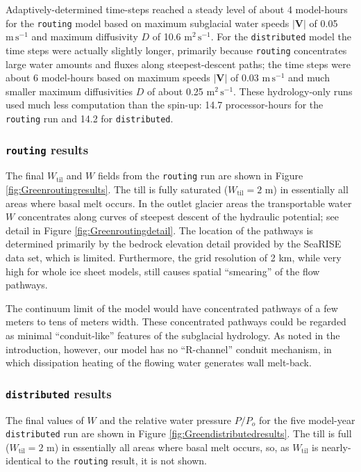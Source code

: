 \documentclass[gmd]{copernicus}   %
\newcommand{\text}{\textrm}
\newcommand\bV{\mathbf{V}}
\newcommand{\Wtil}{W_{\text{til}}}
\begin{document}
Adaptively-determined time-steps reached a steady level of about 4 model-hours for the \texttt{routing} model based on maximum subglacial water speeds $|\bV|$ of 0.05 $\text{m}\,\text{s}^{-1}$ and maximum diffusivity $D$ of 10.6 $\text{m}^2\,\text{s}^{-1}$.  For the \texttt{distributed} model the time steps were actually slightly longer, primarily because \texttt{routing} concentrates large water amounts and fluxes along steepest-descent paths; the time steps were about 6 model-hours based on maximum speeds $|\bV|$ of 0.03 $\text{m}\,\text{s}^{-1}$ and much smaller maximum diffusivities $D$ of about 0.25 $\text{m}^2\,\text{s}^{-1}$.    These hydrology-only runs used much less computation than the spin-up: 14.7 processor-hours for the \texttt{routing} run and 14.2 for \texttt{distributed}. 

\subsubsection{\texttt{routing} results}  The final $\Wtil$ and $W$ fields from the \texttt{routing} run are shown in Figure \ref{fig:Greenroutingresults}.  The till is fully saturated ($\Wtil=2$ m) in essentially all areas where basal melt occurs.  In the outlet glacier areas the transportable water $W$ concentrates along curves of steepest descent of the hydraulic potential; see detail in Figure \ref{fig:Greenroutingdetail}.  The location of the pathways is determined primarily by the bedrock elevation detail provided by the SeaRISE data set, which is limited.  Furthermore, the grid resolution of 2 km, while very high for whole ice sheet models, still causes spatial ``smearing'' of the flow pathways.

The continuum limit of the model would have concentrated pathways of a few meters to tens of meters width.  These concentrated pathways could be regarded as minimal ``conduit-like'' features of the subglacial hydrology.  As noted in the introduction, however, our model has no ``R-channel'' conduit mechanism, in which dissipation heating of the flowing water generates wall melt-back.

\subsubsection{\texttt{distributed} results}  The final values of $W$ and the relative water pressure $P/P_o$ for the five model-year \texttt{distributed} run are shown in Figure \ref{fig:Greendistributedresults}.  The till is full ($\Wtil=2$ m) in essentially all areas where basal melt occurs, so, as $\Wtil$ is nearly-identical to the \texttt{routing} result, it is not shown.
\end{document}
